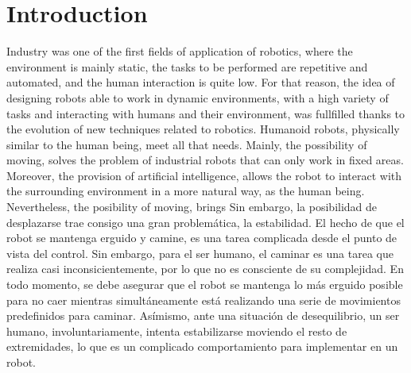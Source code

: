 \chapter{Introduction}
Industry was one of the first fields of application of robotics, where the environment is mainly static, the tasks to be performed are repetitive and automated, and the human interaction is quite low. For that reason, the idea of designing robots able to work in dynamic environments, with a high variety of tasks and interacting with humans and their environment, was fullfilled thanks to the evolution of new techniques related to robotics. Humanoid robots, physically similar to the human being, meet all that needs. Mainly, the possibility of moving, solves the problem of industrial robots that can only work in fixed areas. Moreover, the provision of artificial intelligence, allows the robot to interact with the surrounding environment in a more natural way, as the human being. \\


Nevertheless, the posibility of moving, brings 
Sin embargo, la posibilidad de desplazarse trae consigo una gran problemática, la estabilidad. El hecho de que el robot se mantenga erguido y camine, es una tarea complicada desde el punto de vista del control. Sin embargo, para el ser humano, el caminar es una tarea que realiza casi inconsicientemente, por lo que no es consciente de su complejidad. En todo momento, se debe asegurar que el robot se mantenga lo más erguido posible para no caer mientras simultáneamente está realizando una serie de movimientos predefinidos para caminar. Asímismo, ante una situación de desequilibrio, un ser humano, involuntariamente, intenta estabilizarse moviendo el resto de extremidades, lo que es un complicado comportamiento para implementar en un robot.\\

